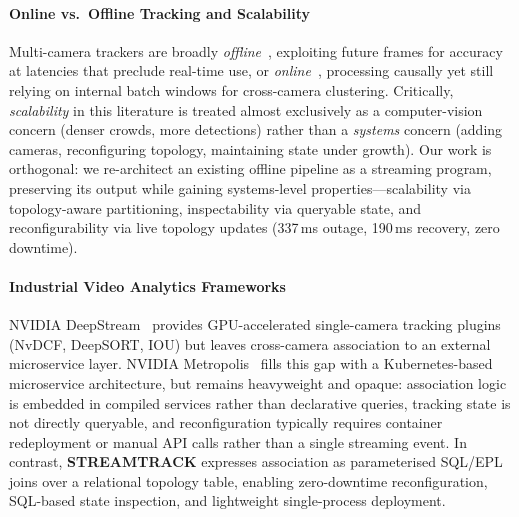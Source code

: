 \documentclass[5p,times]{elsarticle}
\begin{document}
\paragraph{Online vs.\ Offline Tracking and Scalability}
Multi-camera trackers are broadly \emph{offline}~\cite{yoshida2024overlap}, exploiting future frames for accuracy at latencies that preclude real-time use, or \emph{online}~\cite{kim2024cluster,xie2024robust,specker2024ocmctrack}, processing causally yet still relying on internal batch windows for cross-camera clustering. Critically, \emph{scalability} in this literature is treated almost exclusively as a computer-vision concern (denser crowds, more detections) rather than a \emph{systems} concern (adding cameras, reconfiguring topology, maintaining state under growth). Our work is orthogonal: we re-architect an existing offline pipeline as a streaming program, preserving its output while gaining systems-level properties---scalability via topology-aware partitioning, inspectability via queryable state, and reconfigurability via live topology updates (337\,ms outage, 190\,ms recovery, zero downtime).

\paragraph{Industrial Video Analytics Frameworks}
NVIDIA DeepStream~\cite{nvidia2024deepstream} provides GPU-accelerated single-camera tracking plugins (NvDCF, DeepSORT, IOU) but leaves cross-camera association to an external microservice layer. NVIDIA Metropolis~\cite{nvidia2025metropolis} fills this gap with a Kubernetes-based microservice architecture, but remains heavyweight and opaque: association logic is embedded in compiled services rather than declarative queries, tracking state is not directly queryable, and reconfiguration typically requires container redeployment or manual API calls rather than a single streaming event. In contrast, \textbf{STREAMTRACK} expresses association as parameterised SQL/EPL joins over a relational topology table, enabling zero-downtime reconfiguration, SQL-based state inspection, and lightweight single-process deployment.
\end{document}
